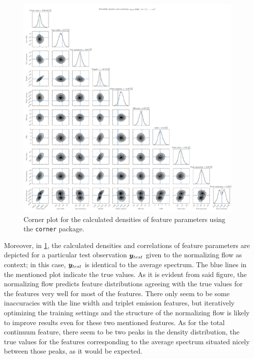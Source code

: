 \documentclass[a4paper,12pt]{report}
\begin{document}
\begin{figure}[h!]
\centering
\includegraphics[width=\textwidth]{figures/nf-feature-extraction-example-2-corner.pdf}
\cprotect\caption{Corner plot for the calculated densities of feature parameters using the \verb|corner| package.}
\label{fig:nf-feature-extraction-example-2-corner}
\end{figure}

Moreover, in \cref{fig:nf-feature-extraction-example-2-corner}, the calculated densities and correlations of feature parameters are depicted for a particular test observation $\bm{y}_{test}$ given to the normalizing flow as context; in this case, $\bm{y}_{test}$ is identical to the average spectrum. The blue lines in the mentioned plot indicate the true values. As it is evident from said figure, the normalizing flow predicts feature distributions agreeing with the true values for the features very well for most of the features. There only seem to be some inaccuracies with the line width and triplet emission features, but iteratively optimizing the training settings and the structure of the normalizing flow is likely to improve results even for these two mentioned features. As for the total continuum feature, there seem to be two peaks in the density distribution, the true values for the features corresponding to the average spectrum situated nicely between those peaks, as it would be expected.
\end{document}
